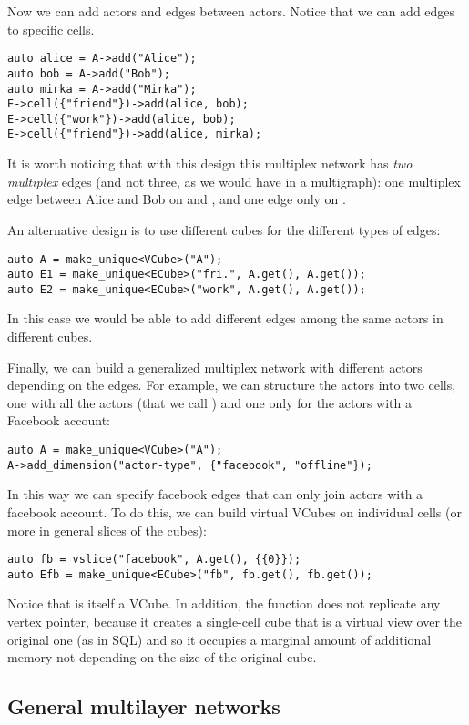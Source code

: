 Now we can add actors and edges between actors. Notice that we can add edges to specific cells.
\begin{lstlisting}[style=c++]
auto alice = A->add("Alice");
auto bob = A->add("Bob");
auto mirka = A->add("Mirka");
E->cell({"friend"})->add(alice, bob);
E->cell({"work"})->add(alice, bob);
E->cell({"friend"})->add(alice, mirka);
\end{lstlisting}
It is worth noticing that with this design this multiplex network has \emph{two multiplex} edges (and not three, as we would have in a multigraph): one multiplex edge between Alice and Bob on  and , and one edge only on .

An alternative design is to use different cubes for the different types of edges:
\begin{lstlisting}[style=c++]
auto A = make_unique<VCube>("A");
auto E1 = make_unique<ECube>("fri.", A.get(), A.get());
auto E2 = make_unique<ECube>("work", A.get(), A.get());
\end{lstlisting}
In this case we would be able to add different edges among the same actors in different cubes.

Finally, we can build a generalized multiplex network with different actors depending on the edges. For example, we can structure the actors into two cells, one with all the actors (that we call ) and one only for the actors with a Facebook account:
\begin{lstlisting}[style=c++]
auto A = make_unique<VCube>("A");
A->add_dimension("actor-type", {"facebook", "offline"});
\end{lstlisting}
In this way we can specify facebook edges that can only join actors with a facebook account. To do this, we can build virtual VCubes on individual cells (or more in general slices of the cubes):
\begin{lstlisting}[style=c++]
auto fb = vslice("facebook", A.get(), {{0}});
auto Efb = make_unique<ECube>("fb", fb.get(), fb.get());
\end{lstlisting}
Notice that  is itself a VCube. In addition, the  function does not replicate any vertex pointer, because it creates a single-cell cube that is a virtual view over the original one (as in SQL) and so it occupies a marginal amount of additional memory not depending on the size of the original cube.

\subsection{General multilayer networks}

